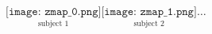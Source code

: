 \documentclass[varwidth,convert]{standalone}
\begin{document}
$
\underset{\text{subject 1}}{\texttt{[image: zmap\_0.png]}}
\underset{\text{subject 2}}{\texttt{[image: zmap\_1.png]}} \boldsymbol{\ldots}
$
\end{document}
